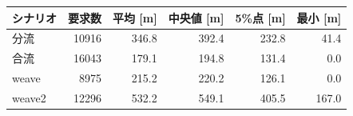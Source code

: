 \begin{tabular}{lrrrrr}
\hline \hline
シナリオ & 要求数 & 平均 [m] & 中央値 [m] & 5\%点 [m] & 最小 [m] \\
\hline
分流 & 10916 & 346.8 & 392.4 & 232.8 & 41.4 \\
合流 & 16043 & 179.1 & 194.8 & 131.4 & 0.0 \\
weave & 8975 & 215.2 & 220.2 & 126.1 & 0.0 \\
weave2 & 12296 & 532.2 & 549.1 & 405.5 & 167.0 \\
\hline
\end{tabular}
